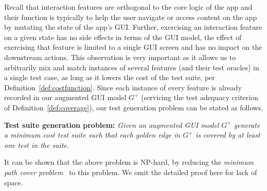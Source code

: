 \label{sec:traversalAlgo}

Recall that interaction features are orthogonal to the core logic of the app and their function is typically to help the user navigate or access content on the app by mutating the state of the app's GUI. Further, exercising an interaction feature on a given state has no side effects in terms of the GUI model, \ie the effect of exercising that feature is limited to a single GUI screen and has no impact on the downstream actions. This observation is very important as it allows us to arbitrarily mix and match instances of several features (and their test oracles) in a single test case, as long as it lowers the cost of the test suite, per Definition~\ref{def:costfunction}. Since each instance of every feature is already recorded in our augmented GUI model $G^+$ (servicing the test adequacy criterion of Definition~\ref{def:coverage}), our test generation problem can be stated as follows.

\noindent\textbf{Test suite generation problem:} \textit{Given an augmented GUI model $G^+$ generate a minimum cost test suite such that each golden edge in $G^+$ is covered by at least one test in the suite.}


It can be shown that the above problem is NP-hard, by reducing the \textit{minimum path cover problem}~\cite{PathCover:NtafosH79} to this problem. We omit the detailed proof here for lack of space.

